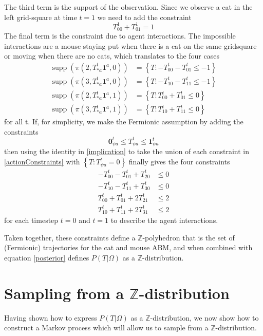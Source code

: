 \documentclass{article}
\DeclareMathOperator\supp{supp}
\begin{document}
The third term is the support of the observation. Since we observe a cat in the left grid-square at time $t=1$ we need to add the constraint
\[
T^1_{0 0} + T^1_{0 1} = 1
\]
The final term is the constraint due to agent interactions. The impossible interactions are a mouse staying put when there is a cat on the same gridsquare or moving when there are no cats, which translates to the four cases
\begin{equation}
\begin{aligned}
\supp(\pi(2,T^t_{* a}\mathbf{1}^a,0)) &= \left\{ T: -T^t_{0 0} - T^t_{0 1} \le -1 \right\}\\
\supp(\pi(3,T^t_{* a}\mathbf{1}^a,0)) &= \left\{ T: -T^t_{1 0} - T^t_{1 1} \le -1 \right\}\\
\supp(\pi(2,T^t_{* a}\mathbf{1}^a,1)) &= \left\{ T: T^t_{0 0} + T^t_{0 1} \le 0 \right\}\\
\supp(\pi(3,T^t_{* a}\mathbf{1}^a,1)) &= \left\{ T: T^t_{1 0} + T^t_{1 1} \le 0 \right\}
\end{aligned}
\label{actionConstraints}
\end{equation}
for all t. If, for simplicity, we make the Fermionic assumption by adding the constraints
\[
\mathbf{0}^t_{\psi a} \le T^t_{\psi a} \le \mathbf{1}^t_{\psi a}
\]
then using the identity in \eqref{implication} to take the union of each constraint in \eqref{actionConstraints} with $\left\{T: T^t_{\psi a} = 0\right\}$ finally gives the four constraints
\[
\begin{aligned}
-T^t_{0 0} - T^t_{0 1} + T^t_{2 0} & \le 0\\
-T^t_{1 0} - T^t_{1 1} + T^t_{3 0} & \le 0\\
T^t_{0 0} + T^t_{0 1} + 2T^t_{2 1} & \le 2 \\
T^t_{1 0} + T^t_{1 1} + 2T^t_{3 1} & \le 2
\end{aligned}
\]
for each timestep $t=0$ and $t=1$ to describe the agent interactions.

Taken together, these constraints define a $\mathbb{Z}$-polyhedron that is the set of (Fermionic) trajectories for the cat and mouse ABM, and when combined with equation \eqref{posterior} defines $P(T|\Omega)$ as a $\mathbb{Z}$-distribution.

\section{Sampling from a $\mathbb{Z}$-distribution}

Having shown how to express $P(T|\Omega)$ as a $\mathbb{Z}$-distribution, we now show how to construct a Markov process which will allow us to sample from a $\mathbb{Z}$-distribution.
\end{document}
